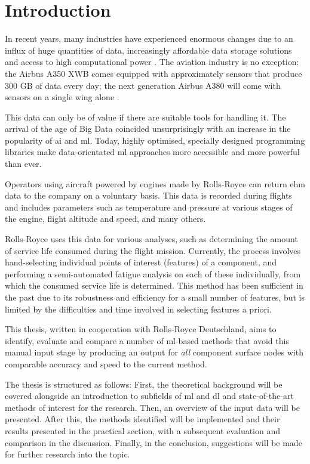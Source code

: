 \section{Introduction}
In recent years, many industries have experienced enormous changes due to an influx of huge quantities of data, increasingly affordable data storage solutions and access to high computational power \cite[]{chen_big_2014}. The aviation industry is no exception: the Airbus A350 XWB comes equipped with approximately  sensors that produce 300 GB of data every day; the next generation Airbus A380 will come with  sensors on a single wing alone \cite[]{rajaraman_big_2016}.

This data can only be of value if there are suitable tools for handling it. The arrival of the age of Big Data \cite[]{fan_mining_2013} coincided unsurprisingly with an increase in the popularity of \ac{ai} and \ac{ml}. Today, highly optimised, specially designed programming libraries make data-orientated \ac{ml} approaches more accessible and more powerful than ever.

Operators using aircraft powered by engines made by Rolls-Royce can return \ac{ehm} data to the company on a voluntary basis. This data is recorded during flights and includes parameters such as temperature and pressure at various stages of the engine, flight altitude and speed, and many others.

Rolls-Royce uses this data for various analyses, such as determining the amount of service life consumed during the flight mission. Currently, the process involves hand-selecting individual points of interest (features) of a component, and performing a semi-automated fatigue analysis on each of these individually, from which the consumed service life is determined. This method has been sufficient in the past due to its robustness and efficiency for a small number of features, but is limited by the difficulties and time involved in selecting features a priori.

This thesis, written in cooperation with Rolls-Royce Deutschland, aims to identify, evaluate and compare a number of \ac{ml}-based methods that avoid this manual input stage by producing an output for \textit{all} component surface nodes with comparable accuracy and speed to the current method.

The thesis is structured as follows: First, the theoretical background will be covered alongside an introduction to subfields of \ac{ml} and \ac{dl} and state-of-the-art methods of interest for the research. Then, an overview of the input data will be presented. After this, the methods identified will be implemented and their results presented in the practical section, with a subsequent evaluation and comparison in the discussion. Finally, in the conclusion, suggestions will be made for further research into the topic.